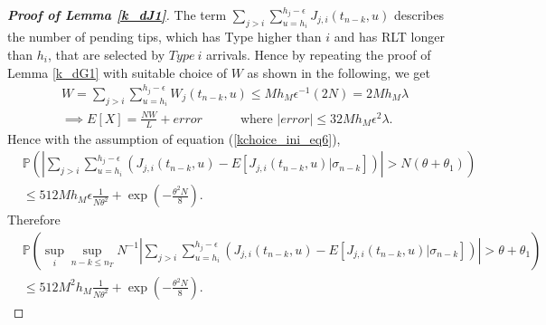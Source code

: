 \documentclass[12pt]{article}
\def\P{\mathbb{P}}
\numberwithin{equation}{section}  %
\begin{document}
\begin{proof}[\textbf{Proof of Lemma \ref{k_dJ1}}]
The term $\sum_{j>i} \sum_{u=h_i}^{h_j-\epsilon}J_{j,i}(t_{n-k},u)$
describes the number of pending tips, which has Type higher than $i$ and has RLT longer than $h_i$, that are selected by {$Type\ i$} arrivals. Hence by repeating the proof of Lemma \ref{k_dG1} with suitable choice of $W$ as shown in the following, we get
\begin{align*} 
W=\sum_{j>i} \sum_{u=h_i}^{h_j-\epsilon}W_{j}(t_{n-k},u)\leq M h_M\epsilon^{-1} (2N)=2Mh_M\lambda\\
\implies
E[X]=\frac{NW}{L}+error \quad\quad\quad\text{where }|error|\leq32Mh_M\epsilon^2\lambda.
\end{align*} 
Hence with the assumption of equation (\ref{kchoice_ini_eq6}),
{
\begin{align*} 
&\P\left(\left|\sum_{j>i}\sum_{u=h_i}^{h_j-\epsilon}
 \left(
 J_{j,i}(t_{n-k},u)-E[J_{j,i}(t_{n-k},u)|\sigma_{n-k}]
 \right)\right|>N(\theta+\theta_1)\right)\\
&\leq512 M h_M\epsilon\frac{1}{N\theta^2}+\exp\left(
-\frac{\theta^2N}{8}\right).
\end{align*} }
Therefore 
\begin{align*} 
&\P\left(\sup_{i}\sup_{n-k\leq n_T}N^{-1}\left|\sum_{j>i}\sum_{u=h_i}^{h_j-\epsilon}
 \left(
 J_{j,i}(t_{n-k},u)-E[J_{j,i}(t_{n-k},u)|\sigma_{n-k}]
 \right)\right|>\theta+\theta_1\right)\\
&\leq 512 M^2 h_M \frac{1}{N\theta^2}+\exp\left(
-\frac{\theta^2N}{8}\right).
\end{align*} 
\end{proof}
\end{document}

